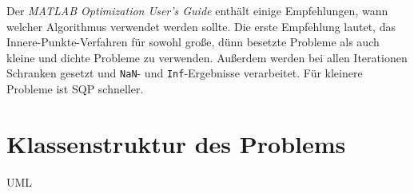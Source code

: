 Der \textit{MATLAB Optimization User's Guide} enthält einige Empfehlungen, wann welcher Algorithmus verwendet werden sollte. Die erste Empfehlung lautet, das Innere-Punkte-Verfahren für sowohl große, dünn besetzte Probleme als auch kleine und dichte Probleme zu verwenden. Außerdem werden bei allen Iterationen Schranken gesetzt und \texttt{NaN}- und \texttt{Inf}-Ergebnisse verarbeitet. Für kleinere Probleme ist SQP schneller.


\section{Klassenstruktur des Problems}

UML

